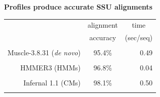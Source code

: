 \documentclass[landscape]{slides}
\begin{document}
\begin{slide}
\begin{center}
\textbf{Profiles produce accurate SSU alignments}
\end{center}
\medskip
\medskip
\begin{center}

\begin{tabular}{rcr} 
& \multicolumn{1}{c}{alignment} & \multicolumn{1}{c}{time} \\
& \multicolumn{1}{c}{accuracy} & \multicolumn{1}{c}{(sec/seq)} \\ \hline
& \multicolumn{1}{c}{} & \multicolumn{1}{c}{} \\
Muscle-3.8.31 (\emph{de novo}) & 95.4\% & 0.49 \\ 
& \multicolumn{1}{c}{} & \multicolumn{1}{c}{} \\
HMMER3 (HMMs) & 96.8\% & 0.04 \\ 
& \multicolumn{1}{c}{} & \multicolumn{1}{c}{} \\
Infernal 1.1 (CMs) & 98.1\% & 0.50 \\
& \multicolumn{1}{c}{} & \multicolumn{1}{c}{} \\
\end{tabular}
\end{center}

\vfill
\scriptsize
{}
\end{slide}
\end{document}
